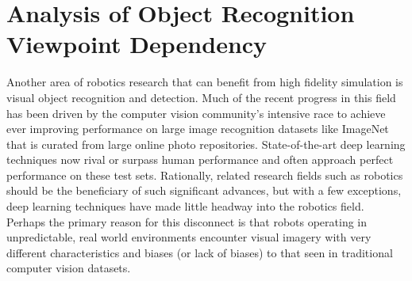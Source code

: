 \documentclass[letterpaper, 10 pt, conference]{ieeeconf}  %
\begin{document}



\section{Analysis of Object Recognition Viewpoint Dependency}

Another area of robotics research that can benefit from high fidelity simulation is visual object recognition and detection.
Much of the recent progress in this field has been driven by the computer vision community's intensive race to achieve ever improving performance on large image recognition datasets like ImageNet \cite{Russakovsky14} that is curated from large online photo repositories. State-of-the-art deep learning techniques now rival or surpass human performance and often approach perfect performance on these test sets. Rationally, related research fields such as robotics should be the beneficiary of such significant advances, but with a few exceptions, deep learning techniques have made little headway into the robotics field. Perhaps the primary reason for this disconnect is that robots operating in unpredictable, real world environments encounter visual imagery with very different characteristics and biases (or lack of biases) to that seen in traditional computer vision datasets. 
\end{document}

